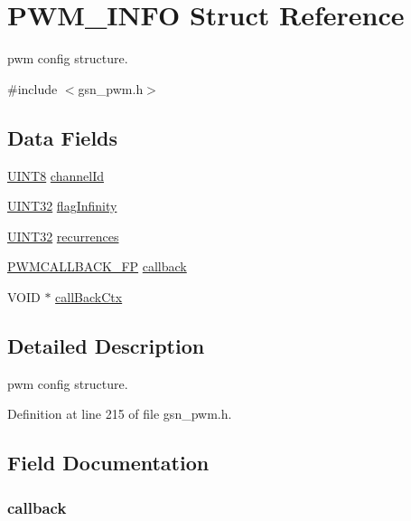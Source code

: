 \hypertarget{a00454}{
\section{PWM\_\-INFO Struct Reference}
\label{a00454}
}


pwm config structure.  




{\ttfamily \#include $<$gsn\_\-pwm.h$>$}

\subsection*{Data Fields}
\begin{DoxyCompactItemize}
\item 
\hyperlink{a00660_gab27e9918b538ce9d8ca692479b375b6a}{UINT8} \hyperlink{a00454_a5fe6420ab870372b553e57cb7e8ac132}{channelId}
\item 
\hyperlink{a00660_gae1e6edbbc26d6fbc71a90190d0266018}{UINT32} \hyperlink{a00454_adaf75417ba21f372248f539e747cc9fa}{flagInfinity}
\item 
\hyperlink{a00660_gae1e6edbbc26d6fbc71a90190d0266018}{UINT32} \hyperlink{a00454_acb2c805621299ebc4701d5cedd03f10c}{recurrences}
\item 
\hyperlink{a00540_aa93497a56b4caa3bd5b0084edd9d256a}{PWMCALLBACK\_\-FP} \hyperlink{a00454_a89ce261adffd740236f9305881b99cd1}{callback}
\item 
VOID $\ast$ \hyperlink{a00454_afb65caed518d124a037c22bd2e25ff92}{callBackCtx}
\end{DoxyCompactItemize}


\subsection{Detailed Description}
pwm config structure. 

Definition at line 215 of file gsn\_\-pwm.h.



\subsection{Field Documentation}
\hypertarget{a00454_a89ce261adffd740236f9305881b99cd1}{
\subsubsection[{callback}]{ {\bf callback}}}
\label{a00454_a89ce261adffd740236f9305881b99cd1}


